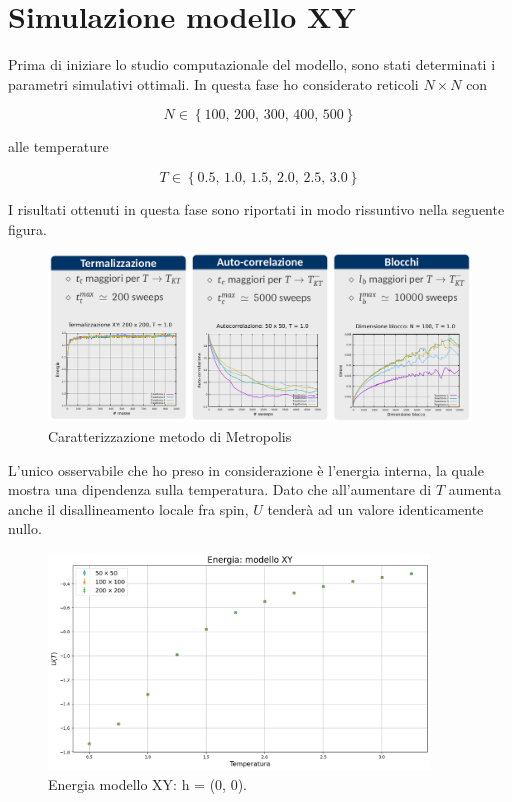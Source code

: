 \section{Simulazione modello XY}

Prima di iniziare lo studio computazionale del modello, sono stati determinati i parametri simulativi ottimali. In questa 
fase ho considerato reticoli $N \times N$ con 

$$
N \in \left\{100,\,200,\,300,\,400,\,500\right\}
$$

alle temperature

$$
T \in \left\{0.5,\,1.0,\,1.5,\,2.0,\,2.5,\,3.0\right\}
$$

I risultati ottenuti in questa fase sono riportati in modo rissuntivo nella seguente figura.

\begin{figure}[H]
    \centering
    \includegraphics[width=\textwidth]{Immagini/simModelloXY/carMetro.png}
    \caption{Caratterizzazione metodo di Metropolis}
    \label{fig: carXY_metro}
\end{figure}

L'unico osservabile che ho preso in considerazione è l'energia interna, la quale mostra una dipendenza 
sulla temperatura. Dato che all'aumentare di $T$ aumenta anche il disallineamento locale fra spin, $U$ 
tenderà ad un valore identicamente nullo.

\begin{figure}[H]
  \centering
  \includegraphics[width=0.9\textwidth]{Immagini/simModelloXY/ene.png}
  \caption{Energia modello XY: h = (0, 0).}
  \label{fig: ene_XY}
\end{figure}


